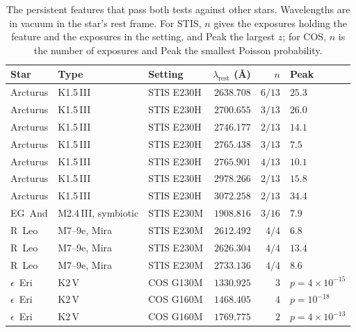 \documentclass[3p,11pt]{elsarticle}
\begin{document}
\begin{table}[t]
\centering\small
\setlength{\tabcolsep}{5pt}
\caption{The persistent features that pass both tests against other stars. Wavelengths
are in vacuum in the star's rest frame. For STIS, $n$ gives the exposures holding the
feature and the exposures in the setting, and Peak the largest $z$; for COS, $n$ is the
number of exposures and Peak the smallest Poisson probability.}
\label{tab:left}
\begin{tabular}{@{}lllrrl@{}}
\toprule
Star & Type & Setting & $\lambda_{\mathrm{rest}}$ (\AA) & $n$ & Peak\\
\midrule
Arcturus & K1.5\,III & STIS E230H & $2638.708$ & $6/13$ & $25.3$\\
Arcturus & K1.5\,III & STIS E230H & $2700.655$ & $3/13$ & $26.0$\\
Arcturus & K1.5\,III & STIS E230H & $2746.177$ & $2/13$ & $14.1$\\
Arcturus & K1.5\,III & STIS E230H & $2765.438$ & $3/13$ & $7.5$\\
Arcturus & K1.5\,III & STIS E230H & $2765.901$ & $4/13$ & $10.1$\\
Arcturus & K1.5\,III & STIS E230H & $2978.266$ & $2/13$ & $15.8$\\
Arcturus & K1.5\,III & STIS E230H & $3072.258$ & $2/13$ & $34.4$\\
EG~And & M2.4\,III, symbiotic & STIS E230M & $1908.816$ & $3/16$ & $7.9$\\
R~Leo & M7--9e, Mira & STIS E230M & $2612.492$ & $4/4$ & $6.8$\\
R~Leo & M7--9e, Mira & STIS E230M & $2626.304$ & $4/4$ & $13.4$\\
R~Leo & M7--9e, Mira & STIS E230M & $2733.136$ & $4/4$ & $8.6$\\
$\epsilon$~Eri & K2\,V & COS G130M & $1330.925$ & $3$ & $p=4\times10^{-15}$\\
$\epsilon$~Eri & K2\,V & COS G160M & $1468.405$ & $4$ & $p=10^{-18}$\\
$\epsilon$~Eri & K2\,V & COS G160M & $1769.775$ & $2$ & $p=4\times10^{-13}$\\
\bottomrule
\end{tabular}
\end{table}
\end{document}

